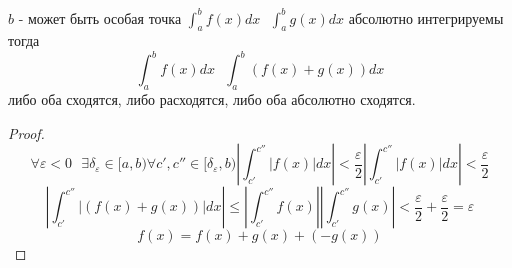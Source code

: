 \begin{theorem}
  $b$ - может быть особая точка $\int_a^b f(x)dx ~~~ \int_a^b g(x)dx$
абсолютно интегрируемы тогда
  $$
  \int_a^b f(x)dx ~~~ \int_a^b (f(x) + g(x)) dx
  $$
  либо оба сходятся, либо расходятся, либо оба абсолютно сходятся.
\end{theorem}

\begin{proof}
  $$
  \forall \varepsilon < 0 ~~~ \exists \delta_{\varepsilon} \in [a,b)
  \forall c', c'' \in [\delta_{\varepsilon}, b)
  \left| \int_{c'}^{c''} |f(x)|dx \right| < \frac{\varepsilon}{2}
  \left| \int_{c'}^{c''} |f(x)|dx \right| < \frac{\varepsilon}{2}
  $$
  $$
  \left| \int_{c'}^{c''} |(f(x) + g(x))| dx \right| \le
  \left| \int_{c'}^{c''} f(x) \right| \left| \int_{c'}^{c''} g(x) \right|
  < \frac{\varepsilon}{2} + \frac{\varepsilon}{2} = \varepsilon
  $$
  $$
  f(x) = f(x) + g(x) + (-g(x))
  $$
\end{proof}
